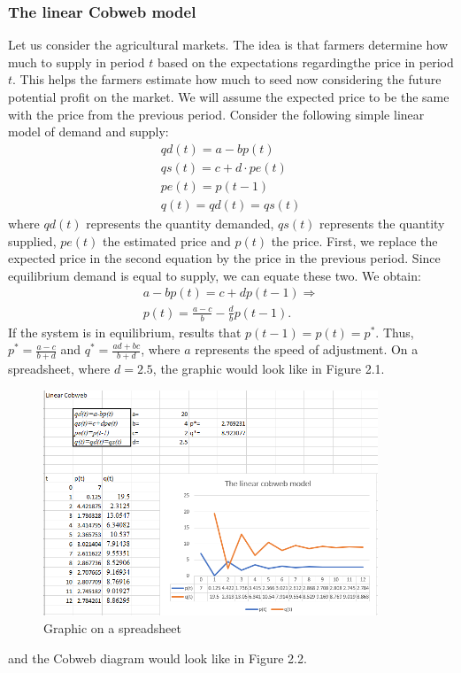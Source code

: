\documentclass[a4paper,11pt]{report}
\begin{document}
\subsubsection{The linear Cobweb model}
Let us consider the agricultural markets. The idea is that farmers determine how much to supply in period $t$ based on the expectations regardingthe price in period $t$. This helps the farmers estimate how much to seed now considering the future potential profit on the market.
We will assume the expected price to be the same with the price from the previous period. Consider the following simple linear model of demand and supply:
\begin{align}
 qd(t)=a-bp(t) \\
 qs(t)=c+d\cdot pe(t)\\
 pe(t)=p(t-1)\\
 q(t)=qd(t)=qs(t)
\end{align}
where $qd(t)$ represents the quantity demanded, $qs(t)$ represents the quantity supplied, $pe(t)$ the estimated price and $p(t)$ the price. First, we replace the expected price in the second equation by the price in the previous period. Since equilibrium demand is equal to supply, we can equate these two. We obtain:
\begin{align*}
 a-bp(t)=c+dp(t-1)\Rightarrow \\
 p(t)=\frac{a-c}{b}-\frac{d}{b}p(t-1).
\end{align*}
If the system is in equilibrium, results that $p(t-1)=p(t)=p^{*}$. Thus, $p^{*}=\frac{a-c}{b+d}$ and $q^{*}=\frac{ad+bc}{b+d}$, where $a$ represents the speed of adjustment.
On a spreadsheet, where $d=2.5$, the graphic would look like in Figure 2.1.
\begin{figure}[h]\label{cobweb}
\caption{Graphic on a spreadsheet}
\centering
 \includegraphics[width=10cm]{Cobweb.PNG}
\end{figure}
and the Cobweb diagram would look like in Figure 2.2.
\end{document}

